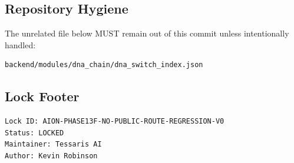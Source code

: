 \subsection{Repository Hygiene}

The unrelated file below MUST remain out of this commit unless intentionally handled:

\begin{verbatim}
backend/modules/dna_chain/dna_switch_index.json
\end{verbatim}

\subsection{Lock Footer}

\begin{verbatim}
Lock ID: AION-PHASE13F-NO-PUBLIC-ROUTE-REGRESSION-V0
Status: LOCKED
Maintainer: Tessaris AI
Author: Kevin Robinson
\end{verbatim}
